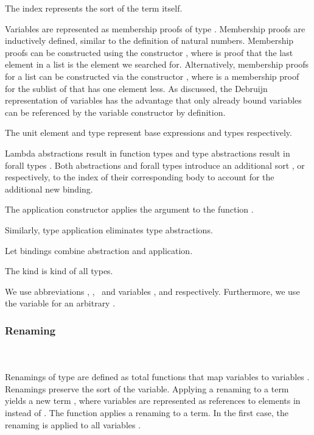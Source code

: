 \noindent The index  represents the sort of the term itself.

\newpage 

\FTerm
Variables   are represented as membership proofs of type   .
Membership proofs are inductively defined, similar to the definition of natural numbers. 
Membership proofs can be constructed using the constructor , where  is proof that the last element in a list  is the element we searched for. 
Alternatively, membership proofs for a list  can be constructed via the constructor  , where  is a membership proof for the sublist  of  that has one element less. 
As discussed, the Debruijn representation of variables has the advantage that only already bound variables can be referenced by the variable constructor by definition. 

\noindent The unit element  and type  represent base expressions and types respectively. 

\noindent Lambda abstractions   result in function types    and type abstractions   result in forall types  . 
Both abstractions and forall types introduce an additional sort , or  respectively, to the index  of their corresponding body to account for the additional new binding.

\noindent The application constructor    applies the argument  to the function .

\noindent Similarly, type application    eliminates type abstractions. 

\noindent Let bindings     combine abstraction and application. 

\noindent The kind  is kind of all types.

\noindent We use abbreviations \FVar, \FExpr, \FType\ and variables ,  and  respectively. Furthermore, we use the variable  for an arbitrary   .

\subsubsection{Renaming}\hfill\\\\
Renamings  of type    are defined as total functions that map variables    to variables   . 
Renamings preserve the sort  of the variable.
\FRen
Applying a renaming    to a term    yields a new term   , where variables are represented as references to elements in  instead of . The function  applies a renaming to a term.
\Fren
In the first case, the renaming is applied to all variables .

